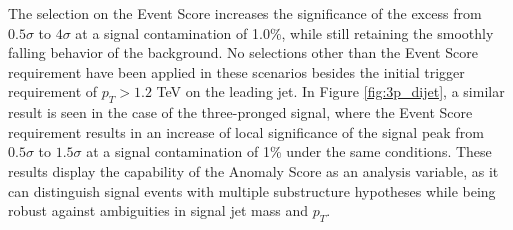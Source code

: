 \documentclass[12pt, a4paper]{article}
\begin{document}
The selection on the Event Score increases the significance of the excess from $0.5\sigma$ to $4\sigma$ at a signal contamination of 1.0\%, while still retaining the smoothly falling behavior of the background. No selections other than the Event Score requirement have been applied in these scenarios besides the initial trigger requirement of $p_{T} > 1.2$ TeV on the leading jet. In Figure \ref{fig:3p_dijet}, a similar result is seen in the case of the three-pronged signal, where the Event Score requirement results in an increase of local significance of the signal peak from $0.5\sigma$ to $1.5\sigma$ at a signal contamination of 1\% under the same conditions. These results display the capability of the Anomaly Score as an analysis variable, as it can distinguish signal events with multiple substructure hypotheses while being robust against ambiguities in signal jet mass and $p_{T}$.
\end{document}
